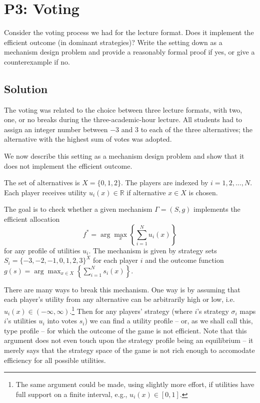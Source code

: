 \documentclass{article}
\newcommand{\enterProblemHeader}[1]{
\nobreak\extramarks{#1}{#1 continued on next page\ldots}\nobreak
\nobreak\extramarks{#1 (continued)}{#1 continued on next page\ldots}\nobreak
}
\newcommand{\exitProblemHeader}[1]{
\nobreak\extramarks{#1 (continued)}{#1 continued on next page\ldots}\nobreak
\nobreak\extramarks{#1}{}\nobreak
}
\newcounter{homeworkProblemCounter} %
\newcommand{\homeworkProblemName}{}
\newenvironment{ex}[1][Problem \arabic{homeworkProblemCounter}]{ %
\stepcounter{homeworkProblemCounter} %
\renewcommand{\homeworkProblemName}{#1} %
\section{\homeworkProblemName} %
}{
}
\newif\ifsolutions
\begin{document}

\begin{ex}[P3: Voting]
	Consider the voting process we had for the lecture format. Does it implement the efficient outcome (in dominant strategies)? Write the setting down as a mechanism design problem and provide a reasonably formal proof if yes, or give a counterexample if no.
	
	\ifsolutions
	\subsection*{Solution}
	The voting was related to the choice between three lecture formats, with two, one, or no breaks during the three-academic-hour lecture. All students had to assign an integer number between $-3$ and $3$ to each of the three alternatives; the alternative with the highest sum of votes was adopted.
	
	We now describe this setting as a mechanism design problem and show that it does not implement the efficient outcome.
	
	The set of alternatives is $X = \{0,1,2\}$. The players are indexed by $i = 1,2, ..., N$. Each player receives utility $u_i(x) \in \mathbb{R}$ if alternative $x \in X$ is chosen. 
	
	The goal is to check whether a given mechanism $\Gamma = (S, g)$ implements the efficient allocation 
	$$f^* = \arg \max_x \left\{ \sum_{i=1}^N u_i(x) \right\}$$ 
	for any profile of utilities $u_i$. The mechanism is given by strategy sets $S_i = \{-3, -2, -1, 0, 1, 2, 3\}^X$ for each player $i$ and the outcome function $g(s) = \arg \max_{x \in X} \left\{ \sum_{i=1}^N s_i(x) \right\}$.
	
	There are many ways to break this mechanism. One way is by assuming that each player's utility from any alternative can be arbitrarily high or low, i.e. $u_i(x) \in (-\infty, \infty)$.\footnote{The same argument could be made, using slightly more effort, if utilities have full support on a finite interval, e.g., $u_i(x) \in [0,1]$.} 
	Then for any players' strategy (where $i$'s strategy $\sigma_i$ maps $i$'s utilities $u_i$ into votes $s_i$) we can find a utility profile -- or, as we shall call this, type profile -- for which the outcome of the game is not efficient. Note that this argument does not even touch upon the strategy profile being an equilibrium -- it merely says that the strategy space of the game is not rich enough to accomodate efficiency for all possible utilities.
	

\end{ex}
\end{document}
